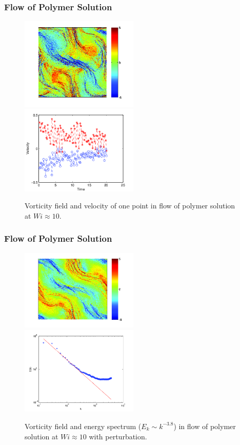 \begin{frame}
  \frametitle{Flow of Polymer Solution}
  \begin{figure}[ht]
    \centering
    \includegraphics[width=0.5\textwidth]{img/polymer_loc-14.png}
    \includegraphics[width=0.5\textwidth]{img/polymer_loc-8.png}
    \caption{Vorticity field and velocity of one point in flow of polymer solution at $Wi\approx10$.}
    \label{fig:vor_pol10}
  \end{figure}
\end{frame}

\begin{frame}
 \frametitle{Flow of Polymer Solution}
  \begin{figure}[t]
    \centering
    \includegraphics[width=0.5\textwidth]{img/polymer_loc-11.png}
 \includegraphics[width=0.5\textwidth]{img/polymer_loc-0.png}
    \caption{Vorticity field and energy spectrum ($E_k\sim k^{-3.8}$) in flow of polymer solution at $Wi\approx10$ with perturbation.}
    \label{fig:vor_per}
  \end{figure}

\end{frame}

